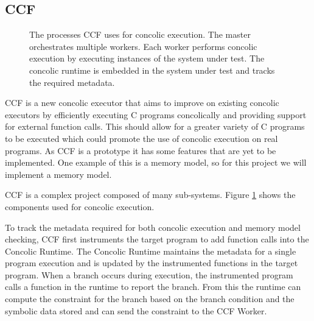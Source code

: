 \documentclass[12pt,twoside]{report}
\begin{document}
\subsection{CCF}

\begin{figure}
    \centering
    \caption{The processes CCF uses for concolic execution. The master orchestrates multiple workers. Each worker performs concolic execution by executing instances of the system under test. The concolic runtime is embedded in the system under test and tracks the required metadata.}
    \label{fig:ccf-processes}
\end{figure}
CCF is a new concolic executor that aims to improve on existing concolic executors by efficiently executing C programs concolically and providing support for external function calls. This should allow for a greater variety of C programs to be executed which could promote the use of concolic execution on real programs. As CCF is a prototype it has some features that are yet to be implemented. One example of this is a memory model, so for this project we will implement a memory model.

CCF is a complex project composed of many sub-systems. Figure \ref{fig:ccf-processes} shows the components used for concolic execution. 

To track the metadata required for both concolic execution and memory model checking, CCF first instruments the target program to add function calls into the Concolic Runtime. The Concolic Runtime maintains the metadata for a single program execution and is updated by the instrumented functions in the target program. When a branch occurs during execution, the instrumented program calls a function in the runtime to report the branch. From this the runtime can compute the constraint for the branch based on the branch condition and the symbolic data stored and can send the constraint to the CCF Worker.
\end{document}
